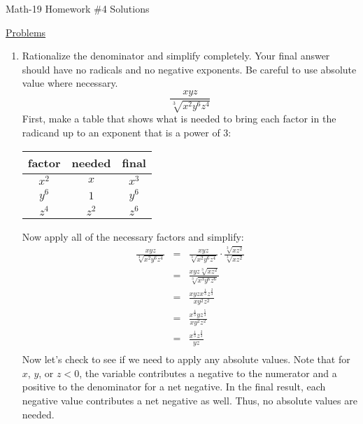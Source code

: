 \documentclass[letterpaper,12pt,fleqn]{article}
\begin{document}
\begin{center}
\Large Math-19 Homework \#4 Solutions
\end{center}

\vspace{0.5in}

\underline{Problems}

\begin{enumerate}
\item Rationalize the denominator and simplify completely. Your final answer
  should have no radicals and no negative exponents. Be careful to use absolute
  value where necessary.
  \[\frac{xyz}{\sqrt[3]{x^2y^6z^4}}\]
  First, make a table that shows what is needed to bring each factor in the
  radicand up to an exponent that is a power of $3$:

  \begin{tabular}{c|c|c}
    factor & needed & final \\
    \hline
    $x^2$ & $x$ & $x^3$ \\
    $y^6$ & $1$ & $y^6$ \\
    $z^4$ & $z^2$ & $z^6$
  \end{tabular}

  Now apply all of the necessary factors and simplify:
  \begin{eqnarray*}
    \frac{xyz}{\sqrt[3]{x^2y^6z^4}} &=&
    \frac{xyz}{\sqrt[3]{x^2y^6z^4}}\cdot\frac{\sqrt[3]{xz^2}}{\sqrt[3]{xz^2}} \\
    &=& \frac{xyz\sqrt[3]{xz^2}}{\sqrt[3]{x^3y^6z^6}} \\
    &=& \frac{xyzx^{\frac{1}{3}}z^{\frac{2}{3}}}{xy^2z^2} \\
    &=& \frac{x^{\frac{4}{3}}yz^{\frac{5}{3}}}{xy^2z^2} \\
    &=& \frac{x^{\frac{1}{3}}z^{\frac{2}{3}}}{yz} \\
  \end{eqnarray*}
  Now let's check to see if we need to apply any absolute values. Note that
  for $x$, $y$, or $z<0$, the variable contributes a negative to the numerator
  and a positive to the denominator for a net negative. In the final result,
  each negative value contributes a net negative as well. Thus, no absolute
  values are needed.


\end{enumerate}
\end{document}
